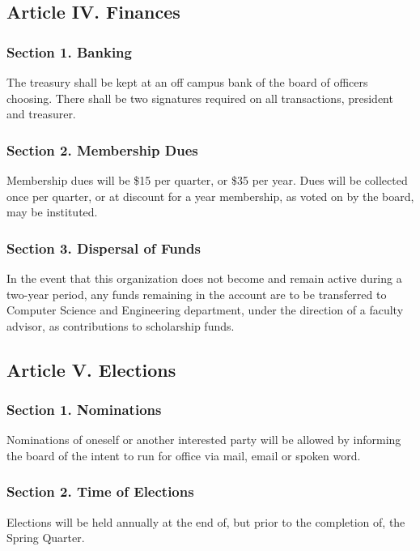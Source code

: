 \documentclass{article}
\begin{document}
  \subsection{Article IV. Finances}

    \subsubsection{Section 1. Banking}
      The treasury shall be kept at an off campus bank of the board of officers choosing. There shall be two signatures required on all transactions, president and treasurer.

    \subsubsection{Section 2. Membership Dues}
      Membership dues will be \$15 per quarter, or \$35 per year. Dues will be collected once per quarter, or at discount for a year membership, as voted on by the board, may be instituted.

    \subsubsection{Section 3. Dispersal of Funds}
      In the event that this organization does not become and remain active during a two-year period, any funds remaining in the account are to be transferred to Computer Science and Engineering department, under the direction of a faculty advisor, as contributions to scholarship funds.


  \subsection{Article V. Elections}

    \subsubsection{Section 1. Nominations}
      Nominations of oneself or another interested party will be allowed by informing the board of the intent to run for office via mail, email or spoken word.

    \subsubsection{Section 2. Time of Elections}
      Elections will be held annually at the end of, but prior to the completion of, the Spring Quarter.
\end{document}
